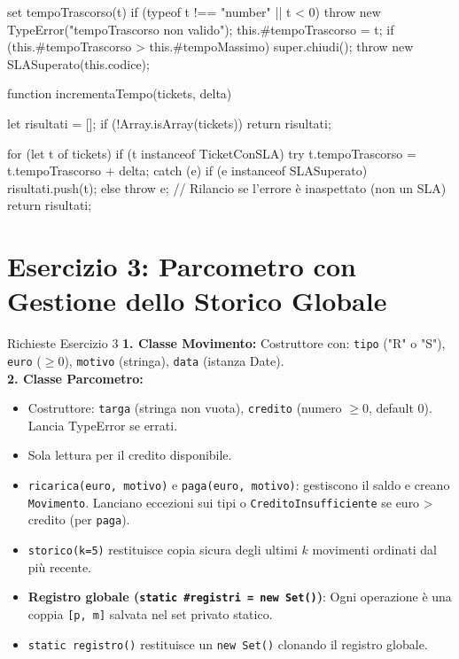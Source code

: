 \begin{jsbox}[title={Soluzione Esercizio 2 - Classi ed Eccezioni}]
{  set tempoTrascorso(t) {
    if (typeof t !== "number" || t < 0) {
      throw new TypeError("tempoTrascorso non valido");
    }
    this.#tempoTrascorso = t;
    if (this.#tempoTrascorso > this.#tempoMassimo) {
      super.chiudi();
      throw new SLASuperato(this.codice);
    }
  }
}

function incrementaTempo(tickets, delta) {
  let risultati = [];
  if (!Array.isArray(tickets)) return risultati;
  
  for (let t of tickets) {
    if (t instanceof TicketConSLA) {
      try {
        t.tempoTrascorso = t.tempoTrascorso + delta;
      } catch (e) {
        if (e instanceof SLASuperato) {
          risultati.push(t);
        } else {
           throw e; // Rilancio se l'errore è inaspettato (non un SLA)
        }
      }
    }
  }
  return risultati;
}
\end{jsbox}

\section{Esercizio 3: Parcometro con Gestione dello Storico Globale}

\begin{definition}{Richieste Esercizio 3}
\textbf{1. Classe Movimento:}
Costruttore con: \texttt{tipo} ("R" o "S"), \texttt{euro} ($\ge 0$), \texttt{motivo} (stringa), \texttt{data} (istanza Date).
\\
\textbf{2. Classe Parcometro:}
\begin{itemize}
    \item Costruttore: \texttt{targa} (stringa non vuota), \texttt{credito} (numero $\ge 0$, default 0). Lancia TypeError se errati.
    \item Sola lettura per il credito disponibile.
    \item \texttt{ricarica(euro, motivo)} e \texttt{paga(euro, motivo)}: gestiscono il saldo e creano \texttt{Movimento}. Lanciano eccezioni sui tipi o \texttt{CreditoInsufficiente} se euro > credito (per \texttt{paga}).
    \item \texttt{storico(k=5)} restituisce copia sicura degli ultimi $k$ movimenti ordinati dal più recente.
    \item \textbf{Registro globale (\texttt{static \#registri = new Set()})}: Ogni operazione è una coppia \texttt{[p, m]} salvata nel set privato statico.
    \item \texttt{static registro()} restituisce un \texttt{new Set()} clonando il registro globale.
\end{itemize}
\end{definition}

